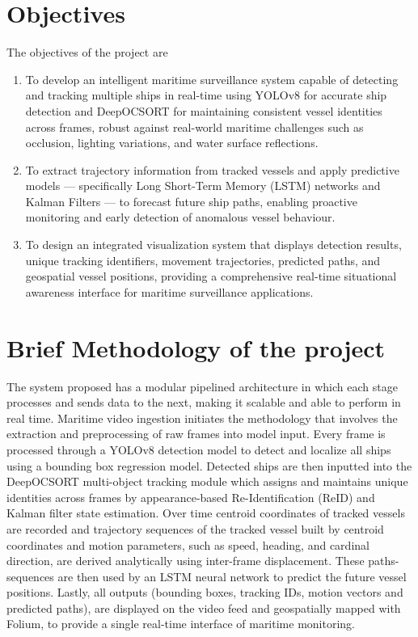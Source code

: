\section[Objectives]{\textbf{Objectives}}

The objectives of the project are
\begin{enumerate}
\item To develop an intelligent maritime surveillance system capable of detecting and tracking multiple ships in real-time using YOLOv8 for accurate ship detection and DeepOCSORT for maintaining consistent vessel identities across frames, robust against real-world maritime challenges such as occlusion, lighting variations, and water surface reflections.
\item To extract trajectory information from tracked vessels and apply predictive models — specifically Long Short-Term Memory (LSTM) networks and Kalman Filters — to forecast future ship paths, enabling proactive monitoring and early detection of anomalous vessel behaviour.
\item To design an integrated visualization system that displays detection results, unique tracking identifiers, movement trajectories, predicted paths, and geospatial vessel positions, providing a comprehensive real-time situational awareness interface for maritime surveillance applications.
\end{enumerate}


\section[Brief Methodology of the project]{\textbf{Brief Methodology of the project}}

The system proposed has a modular pipelined architecture in which each stage processes and sends data to the next, making it scalable and able to perform in real time. Maritime video ingestion initiates the methodology that involves the extraction and preprocessing of raw frames into model input. Every frame is processed through a YOLOv8 detection model to detect and localize all ships using a bounding box regression model. Detected ships are then inputted into the DeepOCSORT multi-object tracking module which assigns and maintains unique identities across frames by appearance-based Re-Identification (ReID) and Kalman filter state estimation. Over time centroid coordinates of tracked vessels are recorded and trajectory sequences of the tracked vessel built by centroid coordinates and motion parameters, such as speed, heading, and cardinal direction, are derived analytically using inter-frame displacement. These paths-sequences are then used by an LSTM neural network to predict the future vessel positions. Lastly, all outputs (bounding boxes, tracking IDs, motion vectors and predicted paths), are displayed on the video feed and geospatially mapped with Folium, to provide a single real-time interface of maritime monitoring.


